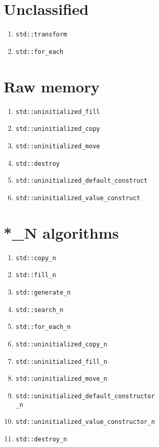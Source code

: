 \documentclass{article}
\begin{document}
\begin{multicols}{3}
\section{Unclassified}
\begin{enumerate}[resume]
\setlength\itemsep{0em}
\item \texttt{std::transform}
\item \texttt{std::for\_each}
\end{enumerate}

\section{Raw memory}
\begin{enumerate}[resume]
\setlength\itemsep{0em}
\item \texttt{std::uninitialized\_fill}
\item \texttt{std::uninitialized\_copy}
\item \texttt{std::uninitialized\_move}
\item \texttt{std::destroy}

\item \footnotesize{\texttt{std::uninitialized\_default\_construct}}
\item \texttt{std::uninitialized\_value\_construct}
\end{enumerate}

\section{*\_N algorithms}
\begin{enumerate}[resume]
\setlength\itemsep{0em}
\item \texttt{std::copy\_n}
\item \texttt{std::fill\_n}
\item \texttt{std::generate\_n}
\item \texttt{std::search\_n}
\item \texttt{std::for\_each\_n}
\item \texttt{std::uninitialized\_copy\_n}
\item \texttt{std::uninitialized\_fill\_n}
\item \texttt{std::uninitialized\_move\_n}
\item \small{\texttt{std::uninitialized\_default\_constructor\\\_n}}
\item \texttt{std::uninitialized\_value\_constructor\_n}
\item \texttt{std::destroy\_n}
\end{enumerate}
\end{multicols}
\end{document}
